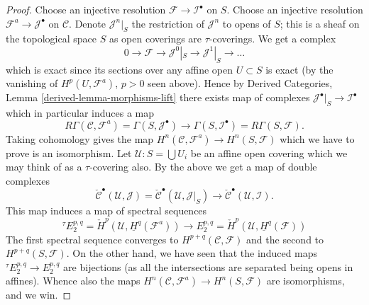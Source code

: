 \begin{proof}
\medskip\noindent
Choose an injective resolution $\mathcal{F} \to \mathcal{I}^\bullet$ on $S$.
Choose an injective resolution $\mathcal{F}^a \to \mathcal{J}^\bullet$
on $\mathcal{C}$. Denote $\mathcal{J}^n|_S$ the restriction of $\mathcal{J}^n$
to opens of $S$; this is a sheaf on the topological space $S$ as open
coverings are $\tau$-coverings. We get a complex
$$
0 \to \mathcal{F} \to \mathcal{J}^0|_S \to \mathcal{J}^1|_S \to \ldots
$$
which is exact since its sections over any affine open $U \subset S$
is exact (by the vanishing of $H^p(U, \mathcal{F}^a)$, $p > 0$ seen
above). Hence by
Derived Categories, Lemma \ref{derived-lemma-morphisms-lift}
there exists map of complexes
$\mathcal{J}^\bullet|_S \to \mathcal{I}^\bullet$ which in particular
induces a map
$$
R\Gamma(\mathcal{C}, \mathcal{F}^a)
=
\Gamma(S, \mathcal{J}^\bullet)
\longrightarrow
\Gamma(S, \mathcal{I}^\bullet)
=
R\Gamma(S, \mathcal{F}).
$$
Taking cohomology gives the map
$H^n(\mathcal{C}, \mathcal{F}^a) \to H^n(S, \mathcal{F})$ which
we have to prove is an isomorphism.
Let $\mathcal{U} : S = \bigcup U_i$ be an affine open covering
which we may think of as a $\tau$-covering also.
By the above we get a map of double complexes
$$
\check{\mathcal{C}}^\bullet(\mathcal{U}, \mathcal{J})
=
\check{\mathcal{C}}^\bullet(\mathcal{U}, \mathcal{J}|_S)
\longrightarrow
\check{\mathcal{C}}^\bullet(\mathcal{U}, \mathcal{I}).
$$
This map induces a map of spectral sequences
$$
{}^\tau\! E_2^{p, q} = \check{H}^p(\mathcal{U}, \underline{H}^q(\mathcal{F}^a))
\longrightarrow
E_2^{p, q} = \check{H}^p(\mathcal{U}, \underline{H}^q(\mathcal{F}))
$$
The first spectral sequence converges to
$H^{p + q}(\mathcal{C}, \mathcal{F})$ and the second to
$H^{p + q}(S, \mathcal{F})$. On the other hand, we have seen
that the induced maps ${}^\tau\! E_2^{p, q} \to E_2^{p, q}$ are
bijections (as all the intersections are separated being opens in affines).
Whence also the maps $H^n(\mathcal{C}, \mathcal{F}^a) \to H^n(S, \mathcal{F})$
are isomorphisms, and we win.
\end{proof}

